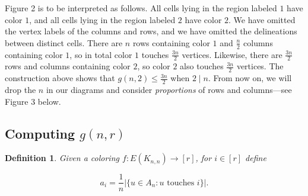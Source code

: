 \documentclass{article}
\newtheorem{definition}{Definition}
\begin{document}
\noindent
Figure 2 is to be interpreted as follows. All cells lying in the region labeled $1$ have color $1$, and all cells lying in the region labeled $2$ have color $2$. We have omitted the vertex labels of the columns and rows, and we have omitted the delineations between distinct cells. There are $n$ rows containing color $1$ and $\frac{n}{2}$ columns containing color $1$, so in total color $1$ touches $\frac{3n}{2}$ vertices. Likewise, there are $\frac{3n}{2}$ rows and columns containing color $2$, so color $2$ also touches $\frac{3n}{2}$ vertices. The construction above shows that $g(n,2) \leq \frac{3n}{2}$ when $2 \mid n$. From now on, we will drop the $n$ in our diagrams and consider \textit{proportions} of rows and columns---see Figure 3 below. \\

\begin{center}
\end{center}

\begin{center}
\section{Computing $g(n,r)$}
\end{center}

\begin{definition}
Given a coloring $f : E(K_{n,n}) \rightarrow [r]$, for $i \in [r]$ define 

$$a_i = \frac{1}{n} |\{u \in A_n : u \text{ touches } i\}|.$$
\end{definition}
\end{document}
